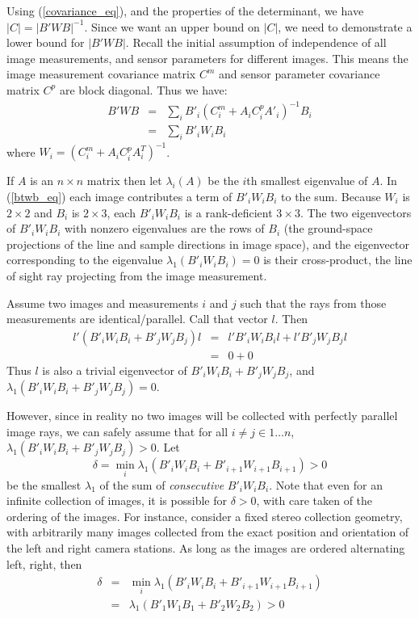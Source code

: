 \documentclass[10pt]{amsart}
\newcommand{\btwbi}{B'_iW_iB_i}
\newcommand{\btwbii}{B'_{i+1}W_{i+1}B_{i+1}}
\newcommand{\btwbj}{B'_jW_jB_j}
\newcommand{\btwbone}{B'_1W_1B_1}
\newcommand{\btwbtwo}{B'_2W_2B_2}
\begin{document}
Using (\ref{covariance_eq}), and the properties of the determinant, we have $|C|
= |B'WB|^{-1}$. Since we want an upper bound on $|C|$, we need to demonstrate a
lower bound for $|B'WB|$. Recall the initial assumption of independence of all
image measurements, and sensor parameters for different images.  This means the image
measurement covariance matrix $C^m$ and sensor parameter covariance matrix $C^p$
are block diagonal. Thus we have:
\begin{eqnarray}\label{btwb_eq}
B'WB & = & \sum_{i}B'_i(C^m_i + A_iC^p_iA'_i)^{-1}B_i \nonumber \\
     & = & \sum_{i}B'_iW_iB_i
\end{eqnarray}
%
where $W_i = (C^m_i + A_iC^p_iA^T_i)^{-1}$.

If $A$ is an $n\times n$ matrix then let $\lambda_i(A)$ be the $i$th smallest
eigenvalue of $A$.  In (\ref{btwb_eq}) each image contributes a term of $\btwbi$
to the sum. Because $W_i$ is $2\times 2$ and $B_i$ is $2\times 3$, each $\btwbi$
is a rank-deficient $3\times 3$. The two eigenvectors of $\btwbi$ with nonzero
eigenvalues are the rows of $B_i$ (the ground-space projections of the line and
sample directions in image space), and the eigenvector corresponding to the
eigenvalue $\lambda_1(\btwbi)=0$ is their cross-product, the line of sight ray
projecting from the image measurement.

Assume two images and measurements $i$ and $j$ such that the rays from those
measurements are identical/parallel. Call that vector $l$. Then
%
\begin{eqnarray*}
l'(\btwbi+\btwbj)l & = & l'\btwbi l + l'\btwbj l \\
                   & = & 0 + 0
\end{eqnarray*}
Thus $l$ is also a trivial eigenvector of $\btwbi+\btwbj$, and $\lambda_1(\btwbi+\btwbj)=0$.

However, since in reality no two images will be collected with perfectly
parallel image rays, we can safely assume that for all $i\ne j\in1\ldots n$, 
$\lambda_1(\btwbi+\btwbj)>0$. Let 
\begin{equation}\label{w_assumption_eq}
\delta = \min_{i}\lambda_1(\btwbi+\btwbii) > 0
\end{equation}
be the smallest $\lambda_1$ of the sum of {\em consecutive} $\btwbi$. Note that
even for an infinite collection of images, it is possible for $\delta>0$, with
care taken of the ordering of the images. For instance, consider a fixed stereo
collection geometry, with arbitrarily many images collected from the exact
position and orientation of the left and right camera stations. As long as the
images are ordered alternating left, right, then
\begin{eqnarray*}
\delta&=&\min_{i}\lambda_1(\btwbi+\btwbii)\\
      &=&\lambda_1(\btwbone+\btwbtwo)>0
\end{eqnarray*}
\end{document}
